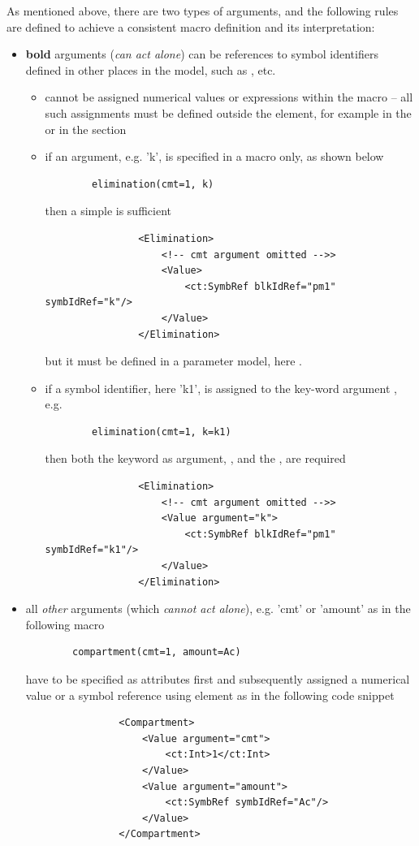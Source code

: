 As mentioned above, there are two types of arguments, and the following rules 
are defined to achieve a consistent macro definition and its interpretation:
\begin{itemize}
\item
\textbf{bold} arguments (\emph{can act alone}) can be references to symbol identifiers defined in other 
places in the model, such as ,  etc.
\begin{itemize}
\item
cannot be assigned numerical values or expressions within the macro -- 
all such assignments must be defined outside the  element, for example in the 
 or in the  section
\item
if an argument, e.g. 'k', is specified in a macro only, as shown below
\lstset{language=NONMEMdataSet}
\begin{lstlisting}
		elimination(cmt=1, k)
\end{lstlisting}
then a simple  is sufficient
 \lstset{language=XML}
\begin{lstlisting}
                <Elimination>
                    <!-- cmt argument omitted -->>
                    <Value>
                        <ct:SymbRef blkIdRef="pm1" symbIdRef="k"/>
                    </Value>
                </Elimination>
\end{lstlisting}
but it must be defined in a parameter model, here .
\item
if a symbol identifier, here 'k1', is assigned to the key-word argument , e.g.
\lstset{language=NONMEMdataSet}
\begin{lstlisting}
		elimination(cmt=1, k=k1)
\end{lstlisting}
 then both the keyword as argument, , and the ,  are required 
 \lstset{language=XML}
\begin{lstlisting}
                <Elimination>
                    <!-- cmt argument omitted -->>
                    <Value argument="k">
                        <ct:SymbRef blkIdRef="pm1" symbIdRef="k1"/>
                    </Value>
                </Elimination>
\end{lstlisting}
\end{itemize}
\item
all \textit{other} arguments (which \emph{cannot act alone}), e.g. 'cmt' or 'amount' as in the following macro
\lstset{language=NONMEMdataSet}
\begin{lstlisting}
		compartment(cmt=1, amount=Ac)
\end{lstlisting}
 \lstset{language=XML}
have to be specified as attributes first and subsequently assigned a numerical value 
or a symbol reference using element  as in the following code snippet
\begin{lstlisting}
                <Compartment>
                    <Value argument="cmt">
                        <ct:Int>1</ct:Int>
                    </Value>
                    <Value argument="amount">
                        <ct:SymbRef symbIdRef="Ac"/>
                    </Value>
                </Compartment>
\end{lstlisting}


\end{itemize}
